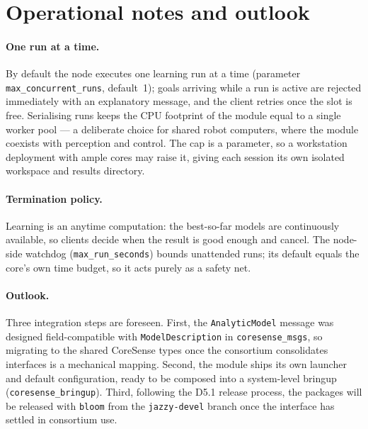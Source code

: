 \section{Operational notes and outlook}
\label{ros2:sec:outlook}

\paragraph{One run at a time.} By default the node executes one learning run
at a time (parameter \texttt{max\_concurrent\_runs}, default~1); goals
arriving while a run is active are rejected immediately with an explanatory
message, and the client retries once the slot is free. Serialising runs keeps the CPU footprint of
the module equal to a single worker pool --- a deliberate choice for shared
robot computers, where the module coexists with perception and control. The
cap is a parameter, so a workstation deployment with ample cores may raise
it, giving each session its own isolated workspace and results directory.

\paragraph{Termination policy.} Learning is an anytime computation: the
best-so-far models are continuously available, so clients decide when the
result is good enough and cancel. The node-side watchdog
(\texttt{max\_run\_seconds}) bounds unattended runs; its default equals the
core's own time budget, so it acts purely as a safety net.

\paragraph{Outlook.} Three integration steps are foreseen. First, the
\texttt{AnalyticModel} message was designed field-compatible with
\texttt{ModelDescription} in \texttt{coresense\_msgs}, so migrating to the
shared CoreSense types once the consortium consolidates interfaces is a
mechanical mapping. Second, the module ships its own launcher and default
configuration, ready to be composed into a system-level bringup
(\texttt{coresense\_bringup}). Third, following the D5.1 release process,
the packages will be released with \texttt{bloom} from the
\texttt{jazzy-devel} branch once the interface has settled in consortium
use.
